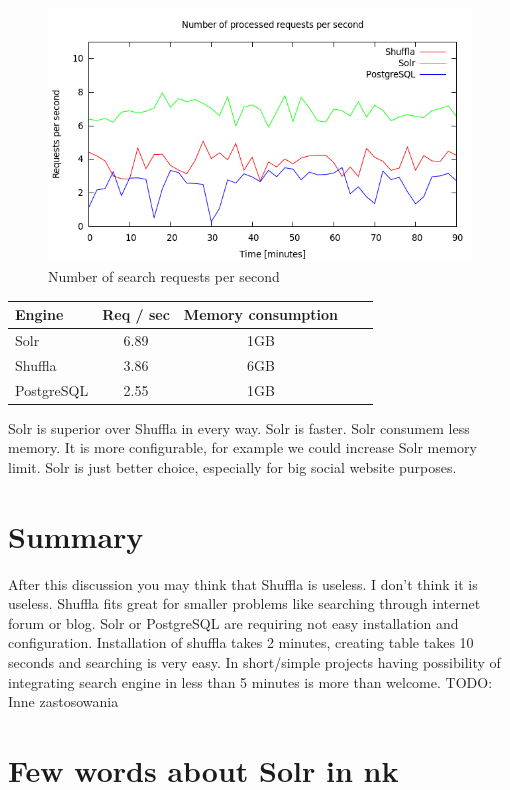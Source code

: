 \documentclass[10pt,a4paper]{article}
\newcommand{\todo}[1]{\noindent\colorbox{myRed}{TODO: #1}}
\begin{document}
\begin{figure}
\centering
  \includegraphics[width=12cm]{request_count_tn}
  \caption{Number of search requests per second}
  \label{fig:request_count_tn}
\end{figure}

\begin{tabular}{|l|c|c|c|c|}
\hline Engine & Req / sec & Memory consumption \\
\hline Solr & 6.89 & 1GB \\
\hline Shuffla & 3.86 & 6GB  \\
\hline PostgreSQL & 2.55 & 1GB \\
\hline 
\end{tabular}

Solr is superior over Shuffla in every way. Solr is faster. Solr consumem less memory. It is more configurable, for example we could increase Solr memory limit. Solr is just better choice, especially for big social website purposes. 

\section{Summary}

After this discussion you may think that Shuffla is useless. I don't think it is useless. Shuffla fits great for smaller problems like searching through internet forum or blog. Solr or PostgreSQL are requiring not easy installation and configuration. Installation of shuffla takes 2 minutes, creating table takes 10 seconds and searching is very easy. In short/simple projects having possibility of integrating search engine in less than 5 minutes is more than welcome. \todo{Inne zastosowania}

\section{Few words about Solr in nk}
\end{document}
